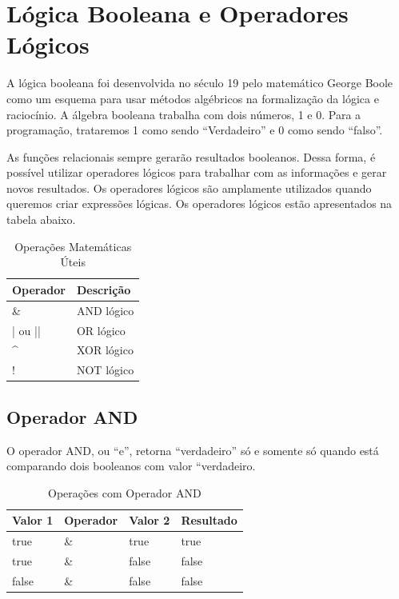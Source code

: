 \documentclass[
]{book}
\begin{document}
\hypertarget{luxf3gica-booleana-e-operadores-luxf3gicos}{%
\section{Lógica Booleana e Operadores Lógicos}\label{luxf3gica-booleana-e-operadores-luxf3gicos}}

A lógica booleana foi desenvolvida no século 19 pelo matemático George Boole como um esquema para usar métodos algébricos na formalização da lógica e raciocínio. A álgebra booleana trabalha com dois números, 1 e 0. Para a programação, trataremos 1 como sendo ``Verdadeiro'' e 0 como sendo ``falso''.

As funções relacionais sempre gerarão resultados booleanos. Dessa forma, é possível utilizar operadores lógicos para trabalhar com as informações e gerar novos resultados. Os operadores lógicos são amplamente utilizados quando queremos criar expressões lógicas. Os operadores lógicos estão apresentados na tabela abaixo.

\begin{table}

\caption{\label{tab:unnamed-chunk-8}Operações Matemáticas Úteis}
\centering
\begin{tabular}[t]{l|l}
\hline
Operador & Descrição\\
\hline
\& & AND lógico\\
\hline
| ou || & OR lógico\\
\hline
\textasciicircum{} & XOR lógico\\
\hline
! & NOT lógico\\
\hline
\end{tabular}
\end{table}

\hypertarget{operador-and}{%
\subsection{Operador AND}\label{operador-and}}

O operador AND, ou ``e'', retorna ``verdadeiro'' só e somente só quando está comparando dois booleanos com valor ``verdadeiro.

\begin{table}

\caption{\label{tab:unnamed-chunk-9}Operações com Operador AND}
\centering
\begin{tabular}[t]{l|l|l|l}
\hline
Valor 1 & Operador & Valor 2 & Resultado\\
\hline
true & \& & true & true\\
\hline
true & \& & false & false\\
\hline
false & \& & false & false\\
\hline
\end{tabular}
\end{table}
\end{document}
